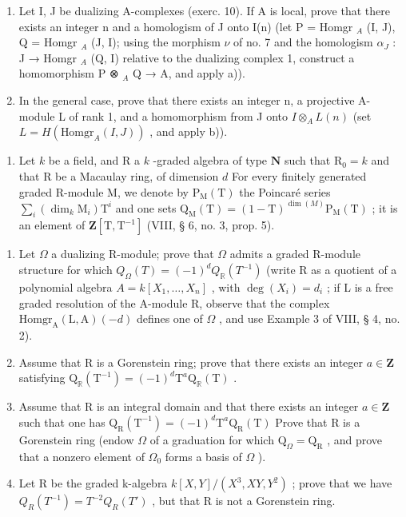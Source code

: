 \begin{enumerate}
\def\labelenumi{\alph{enumi})}
\setcounter{enumi}{1}
\item
  Let I, J be dualizing A-complexes (exerc. 10). If A is local, prove that there exists an integer n and a homologism of J onto I(n) (let P = Homgr \(_A\) (I, J), Q = Homgr \(_A\) (J, I); using the morphism \(\nu\) of no. 7 and the homologism \(\alpha_{J}\) : J → Homgr \(_A\) (Q, I) relative to the dualizing complex 1, construct a homomorphism P ⊗ \(_A\) Q → A, and apply a)).
\item
  In the general case, prove that there exists an integer n, a projective A-module L of rank 1, and a homomorphism from J onto \(I \otimes_{A} L(n)\) (set \(L = H(\text{Homgr}_{A}(I, J))\) , and apply b)).
\end{enumerate}

\begin{enumerate}
\def\labelenumi{\arabic{enumi})}
\setcounter{enumi}{11}
\tightlist
\item
  Let \(k\) be a field, and R a \(k\) -graded algebra of type \(\mathbf{N}\) such that \(\mathrm{R}_0 = k\) and that R be a Macaulay ring, of dimension \(d\) For every finitely generated graded R-module M, we denote by \(\mathrm{P}_{\mathrm{M}}(\mathrm{T})\) the Poincaré series \(\sum_{i} (\dim_k \mathrm{M}_i) \mathrm{T}^i\) and one sets \(\mathrm{Q}_{\mathrm{M}}(\mathrm{T}) = (1 - \mathrm{T})^{\dim(M)} \mathrm{P}_{\mathrm{M}}(\mathrm{T})\) ; it is an element of \(\mathbf{Z}[\mathrm{T}, \mathrm{T}^{-1}]\) (VIII, § 6, no. 3, prop. 5).
\end{enumerate}

\begin{enumerate}
\def\labelenumi{\alph{enumi})}
\item
  Let \(\Omega\) a dualizing R-module; prove that \(\Omega\) admits a graded R-module structure for which \(Q_{\Omega}(T) = (-1)^{d} Q_{\mathbb{R}}(T^{-1})\) (write R as a quotient of a polynomial algebra \(A = k[X_1, \ldots, X_n]\) , with \(\deg(X_i) = d_i\) ; if L is a free graded resolution of the A-module R, observe that the complex \(\mathrm{Homgr}_{\mathrm{A}}(\mathrm{L}, \mathrm{A})(-d)\) defines one of \(\Omega\) , and use Example 3 of VIII, § 4, no. 2).
\item
  Assume that R is a Gorenstein ring; prove that there exists an integer \(a \in \mathbf{Z}\) satisfying \(\mathrm{Q}_{\mathbb{R}}(\mathrm{T}^{-1}) = (-1)^{d}\mathrm{T}^{a}\mathrm{Q}_{\mathbb{R}}(\mathrm{T})\) .
\item
  Assume that R is an integral domain and that there exists an integer \(a \in \mathbf{Z}\) such that one has \(\mathrm{Q}_{\mathrm{R}}(\mathrm{T}^{-1}) = (-1)^{d}\mathrm{T}^{a}\mathrm{Q}_{\mathrm{R}}(\mathrm{T})\) Prove that R is a Gorenstein ring (endow \(\Omega\) of a graduation for which \(\mathrm{Q}_{\Omega} = \mathrm{Q}_{\mathrm{R}}\) , and prove that a nonzero element of \(\Omega_{0}\) forms a basis of \(\Omega\) ).
\item
  Let R be the graded k-algebra \(k[X,Y]/(X^{3},XY,Y^{2})\) ; prove that we have \(Q_{R}(T^{-1}) = T^{-2}Q_{R}(T')\) , but that R is not a Gorenstein ring.
\end{enumerate}

